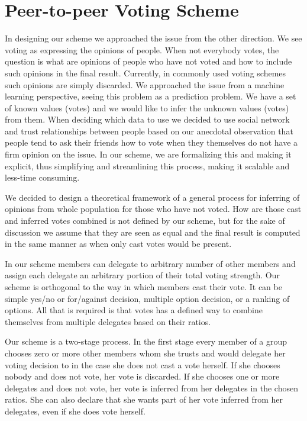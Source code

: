 \documentclass[a4paper]{acm_proc_article-sp}
\begin{document}
\section{Peer-to-peer Voting Scheme}

In designing our scheme we approached the issue from the other direction. We see voting as expressing the opinions of
people. When not everybody votes, the question is what are opinions of people who have not voted and how to include
such opinions in the final result. Currently, in commonly used voting schemes such opinions are simply discarded.
We approached the issue from a machine learning perspective, seeing this problem as a prediction problem. We have a set
of known values (votes) and we would like to infer the unknown values (votes) from them. When deciding which data to
use we decided to use social network and trust relationships between people based on our anecdotal observation that
people tend to ask their friends how to vote when they themselves do not have a firm opinion on the issue. In our scheme,
we are formalizing this and making it explicit, thus simplifying and streamlining this process, making it scalable and
less-time consuming.

We decided to design a theoretical framework of a general process for inferring of opinions from whole population for
those who have not voted. How are those cast and inferred votes combined is not defined by our scheme, but for the
sake of discussion we assume that they are seen as equal and the final result is computed in the same manner as when
only cast votes would be present.

In our scheme members can delegate to arbitrary number of other members and assign each delegate an arbitrary portion
of their total voting strength. Our scheme is orthogonal to the way in which members cast their vote. It can be simple
yes/no or for/against decision, multiple option decision, or a ranking of options. All that is required is that votes has a
defined way to combine themselves from multiple delegates based on their ratios.

Our scheme is a two-stage process. In the first stage every member of a group chooses zero or more other members whom she
trusts and would delegate her voting decision to in the case she does not cast a vote herself. If she chooses nobody and
does not vote, her vote is discarded. If she chooses one or more delegates and does not vote, her vote is inferred from
her delegates in the chosen ratios. She can also declare that she wants part of her vote inferred from her delegates,
even if she does vote herself.
\end{document}
